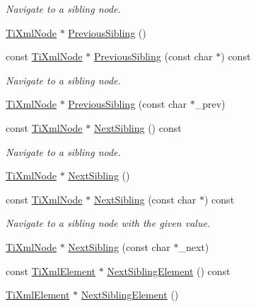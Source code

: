 \begin{DoxyCompactItemize}
\begin{DoxyCompactList}\small\item\em Navigate to a sibling node. \end{DoxyCompactList}\item 
\hyperlink{class_ti_xml_node}{Ti\+Xml\+Node} $\ast$ \hyperlink{class_ti_xml_node_af8c0642ad6ecc03f62953e68896ed1cc}{Previous\+Sibling} ()
\item 
const \hyperlink{class_ti_xml_node}{Ti\+Xml\+Node} $\ast$ \hyperlink{class_ti_xml_node_ace1b618fe58b2b9305fe89bfbc8dd17b}{Previous\+Sibling} (const char $\ast$) const
\begin{DoxyCompactList}\small\item\em Navigate to a sibling node. \end{DoxyCompactList}\item 
\hyperlink{class_ti_xml_node}{Ti\+Xml\+Node} $\ast$ \hyperlink{class_ti_xml_node_a6c977049207177ef21b51972315c2053}{Previous\+Sibling} (const char $\ast$\+\_\+prev)
\item 
const \hyperlink{class_ti_xml_node}{Ti\+Xml\+Node} $\ast$ \hyperlink{class_ti_xml_node_ae99c572ac7901a15993ea7a4efaa10e7}{Next\+Sibling} () const
\begin{DoxyCompactList}\small\item\em Navigate to a sibling node. \end{DoxyCompactList}\item 
\hyperlink{class_ti_xml_node}{Ti\+Xml\+Node} $\ast$ \hyperlink{class_ti_xml_node_a4d05f7b1d7b470ac6887edd072d4892a}{Next\+Sibling} ()
\item 
const \hyperlink{class_ti_xml_node}{Ti\+Xml\+Node} $\ast$ \hyperlink{class_ti_xml_node_a0864ea784b53cdca0a37829d3391ca4b}{Next\+Sibling} (const char $\ast$) const
\begin{DoxyCompactList}\small\item\em Navigate to a sibling node with the given \textquotesingle{}value\textquotesingle{}. \end{DoxyCompactList}\item 
\hyperlink{class_ti_xml_node}{Ti\+Xml\+Node} $\ast$ \hyperlink{class_ti_xml_node_a4080bc5cc8a5c139e7cf308669e850fc}{Next\+Sibling} (const char $\ast$\+\_\+next)
\item 
const \hyperlink{class_ti_xml_element}{Ti\+Xml\+Element} $\ast$ \hyperlink{class_ti_xml_node_ac6105781c913a42aa7f3f17bd1964f7c}{Next\+Sibling\+Element} () const
\item 
\hyperlink{class_ti_xml_element}{Ti\+Xml\+Element} $\ast$ \hyperlink{class_ti_xml_node_a1b211cb5034655a04358e0e2f6fc5010}{Next\+Sibling\+Element} ()

\end{DoxyCompactItemize}
